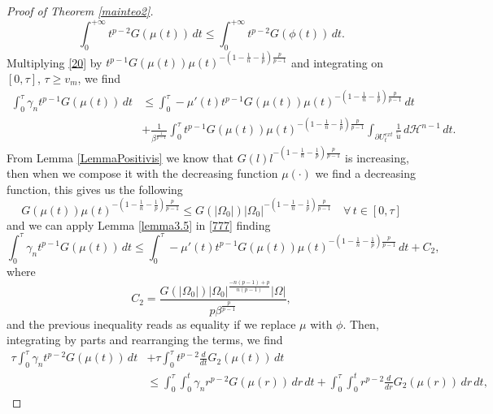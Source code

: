 \documentclass[12pt]{article}
\newcommand{\abs}[1]{{\left|#1\right|}}
\newcommand{\dH}{d\mathcal{H}^{n-1}}
\theoremstyle{definition}
\theoremstyle{plain}
\theoremstyle{definition}
\begin{document}
\begin{proof}[Proof of Theorem \ref{mainteo2}]
    \begin{equation*}
        \int_0^{+\infty}t^{p-2}G(\mu(t))\,dt\leq\int_0^{+\infty}t^{p-2}G(\phi(t))\,dt.
    \end{equation*}
    Multiplying \eqref{20} by $t^{p-1}G(\mu(t))\mu(t)^{-\left(1-\frac{1}{n}-\frac{1}{p}\right)\frac{p}{p-1}}$ and integrating on $[0,\tau]$, $\tau\geq v_m$, we find
    \begin{equation}\label{777}
        \begin{split}
            \int_0^\tau \gamma_n t^{p-1}G(\mu(t))\,dt&\leq\int_0^\tau -\mu'(t)t^{p-1}G(\mu(t))\mu(t)^{-\left(1-\frac{1}{n}-\frac{1}{p}\right)\frac{p}{p-1}}\,dt\\
            &+\frac{1}{\beta^\frac{1}{p-1}}\int_0^\tau t^{p-1}G(\mu(t))\mu(t)^{-\left(1-\frac{1}{n}-\frac{1}{p}\right)\frac{p}{p-1}}\int_{\partial U_t^{ext}}\frac{1}{\tilde u}\,\dH\,dt.
        \end{split}
    \end{equation}
    From Lemma \ref{LemmaPositivis} we know that $G(l)l^{-\left(1-\frac{1}{n}-\frac{1}{p}\right)\frac{p}{p-1}}$ is increasing, then when we compose it with the decreasing function $\mu(\cdot)$ we find a decreasing function, this gives us the following
    \begin{equation*}
        G(\mu(t))\mu(t)^{-\left(1-\frac{1}{n}-\frac{1}{p}\right)\frac{p}{p-1}}\leq G(|\Omega_0|)|\Omega_0|^{-\left(1-\frac{1}{n}-\frac{1}{p}\right)\frac{p}{p-1}} \quad\forall\,t\in[0,\tau]
    \end{equation*}
    and we can apply Lemma \ref{lemma3.5} in \eqref{777} finding
    \begin{equation*}
        \int_0^\tau \gamma_n t^{p-1}G(\mu(t))\,dt\leq\int_0^\tau -\mu'(t)t^{p-1}G(\mu(t))\mu(t)^{-\left(1-\frac{1}{n}-\frac{1}{p}\right)\frac{p}{p-1}}\,dt+C_2,
    \end{equation*}
    where
    \begin{equation*}
        C_2=\frac{G(\abs{\Omega_0})\abs{\Omega_0}^{\frac{-n(p-1)+p}{n(p-1)}}\abs{\Omega}}{p\beta^\frac{p}{p-1}}, 
    \end{equation*}
    and the previous inequality reads as equality if we replace $\mu$ with $\phi$. Then, integrating by parts and rearranging the terms, we find
    \begin{equation*}
        \begin{split}
            \tau\int_0^\tau \gamma_n t^{p-2}G(\mu(t))\,dt&+\tau\int_0^\tau t^{p-2}\frac{d}{dt}G_2(\mu(t))\,dt \\
            &\leq\int_0^\tau\int_0^t \gamma_n r^{p-2}G(\mu(r))\,dr\,dt+\int_0^\tau \int_0^t r^{p-2}\frac{d}{dr}G_2(\mu(r))\,dr\,dt,

\end{split}
\end{equation*}
\end{proof}
\end{document}
